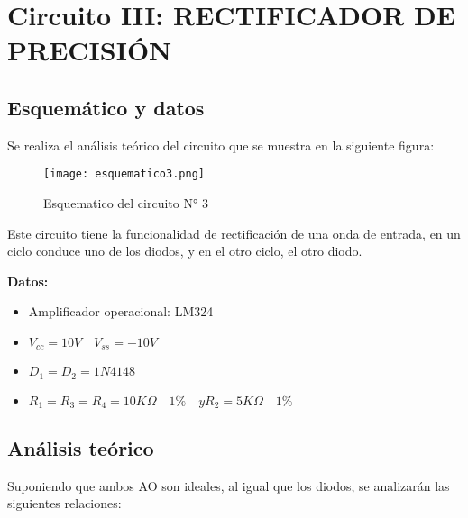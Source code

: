 %

\section{Circuito III: RECTIFICADOR DE PRECISIÓN }

\subsection{Esquemático y datos}
Se realiza el análisis teórico del circuito que se muestra en la siguiente figura: 
\begin{figure}[h!]
     \centering
     \texttt{[image: esquematico3.png]}
	 \caption{Esquematico del circuito N° 3}
	 \label{fig:esquematico3}
 \end{figure}
 
Este circuito tiene la funcionalidad de rectificación de una onda de entrada, en un ciclo conduce uno de los diodos, y en el otro ciclo, el otro diodo.

\vspace{1em}

\textbf {Datos: }

\begin{itemize}
  \item Amplificador operacional: LM324
  \item $V_{cc} =10V \quad V_{ss} =-10V$
  \item $D_1 = D_2 =1N4148$
  \item $R_1 = R_3 = R_4 = 10K\Omega \quad 1\% \quad y R_2 = 5K\Omega \quad 1\% $
\end{itemize}

\vspace{1em}

\subsection{Análisis teórico}
Suponiendo que ambos AO son ideales, al igual que los diodos, se analizarán las siguientes relaciones:

